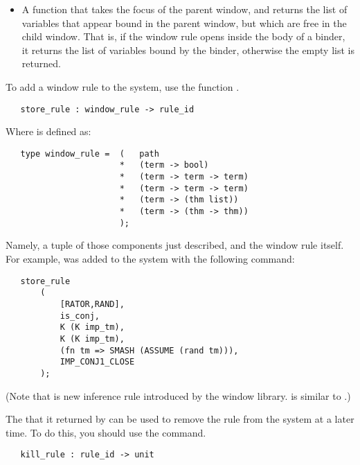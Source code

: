 \begin{itemize}
	\item   A function that takes the focus of the parent window,
		and returns the list of variables that appear
		bound in the parent window, but which are free in the
		child window.
		That is, if the window rule opens inside the body of 
		a binder, it returns the list of variables bound by
		the binder, otherwise the empty list is returned.
\end{itemize}
To add a window rule to the system, use the function
.
\begin{boxed}\begin{verbatim}
   store_rule : window_rule -> rule_id
\end{verbatim}\end{boxed}
Where  is defined as:
\begin{verbatim}
   type window_rule =  (   path
                       *   (term -> bool)
                       *   (term -> term -> term)
                       *   (term -> term -> term)
                       *   (term -> (thm list))
                       *   (term -> (thm -> thm))
                       );
\end{verbatim}
Namely, a tuple of those components just described, and the window rule 
itself.
For example,  was added to the system with the
following command:
\begin{verbatim}
   store_rule
       (
           [RATOR,RAND],
           is_conj,
           K (K imp_tm),
           K (K imp_tm),
           (fn tm => SMASH (ASSUME (rand tm))),
           IMP_CONJ1_CLOSE
       );
\end{verbatim}
(Note that  is new inference rule introduced by the window library.
  is similar to .)

The  that it returned by  can be used to 
remove the rule from the system at a later time.  To do this, you
should use the  command.
\begin{boxed}\begin{verbatim}                            
   kill_rule : rule_id -> unit
\end{verbatim}\end{boxed}


